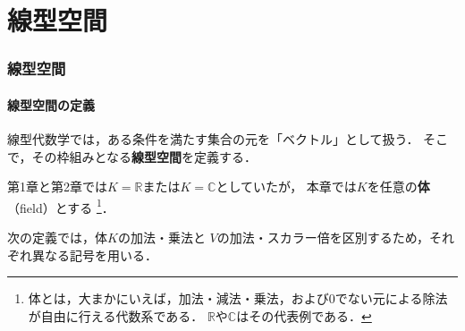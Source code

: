 \part{線型空間}

\begin{abstract}
  この章では，線型空間を導入し，ベクトルを抽象的な立場から捉える．
  これにより，数ベクトルだけでなく，行列や関数なども同じ枠組みで扱えるようになる．
  さらに，線型部分空間，基底，次元などの基本概念を導入し，線型空間の構造について考察する．
\end{abstract}

\section{線型空間}

\subsection{線型空間の定義}


線型代数学では，ある条件を満たす集合の元を「ベクトル」として扱う．
そこで，その枠組みとなる\textbf{線型空間}を定義する．

第1章と第2章では$K=\mathbb{R}$または$K=\mathbb{C}$としていたが，
本章では$K$を任意の\textbf{体}（field）とする%
\footnote{体とは，大まかにいえば，加法・減法・乗法，および$0$でない元による除法が自由に行える代数系である．
$\mathbb{R}$や$\mathbb{C}$はその代表例である．}．

次の定義では，体$K$の加法・乗法と
$V$の加法・スカラー倍を区別するため，それぞれ異なる記号を用いる．

